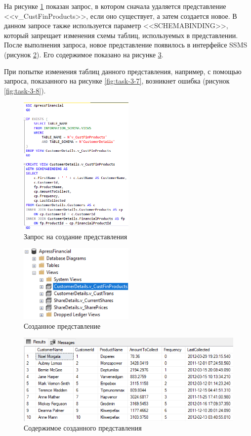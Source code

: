 \documentclass[a4paper, 14pt]{extarticle}
\begin{document}
На рисунке \ref{fig:task-3-4} показан запрос, в котором сначала удаляется
представление <<\foreignlanguage{english}{v\_CustFinProducts}>>, если оно
существует, а затем создается новое. В данном запросе также используется
параметр <<\foreignlanguage{english}{SCHEMABINDING}>>, который запрещает
изменения схемы таблиц, используемых в представлении. После выполнения запроса,
новое представление появилось в интерфейсе SSMS (рисунок \ref{fig:task-3-5}).
Его содержимое показано на рисунке \ref{fig:task-3-6}.

При попытке изменения таблиц данного представления, например, с помощью запроса,
показанного на рисунке \ref{fig:task-3-7}, возникнет ошибка (рисунок
\ref{fig:task-3-8}).

\begin{figure}[H]
  \centering
  \includegraphics[width=0.5\textwidth]{images/task-3/4.png}
  \caption{Запрос на создание представления}
  \label{fig:task-3-4}
\end{figure}

\begin{figure}[H]
  \centering
  \includegraphics[width=0.5\textwidth]{images/task-3/5.png}
  \caption{Созданное представление}
  \label{fig:task-3-5}
\end{figure}

\begin{figure}[H]
  \centering
  \includegraphics[width=\textwidth]{images/task-3/6.png}
  \caption{Содержимое созданного представления}
  \label{fig:task-3-6}
\end{figure}
\end{document}
